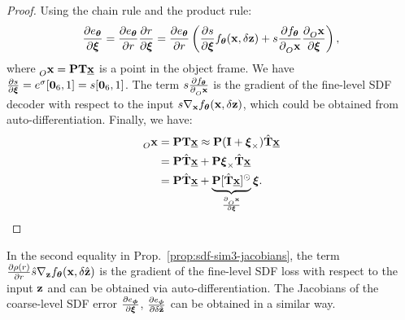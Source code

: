 \begin{proof}
Using the chain rule and the product rule:
\begin{equation*}
\begin{aligned}
  \frac{\partial e_{\boldsymbol{\theta}}}{\partial\boldsymbol{\xi}} 
  = 
  \frac{\partial e_{\boldsymbol{\theta}}}{\partial r}
  \frac{\partial r}{\partial\boldsymbol{\xi}}
  = 
    \frac{\partial e_{\boldsymbol{\theta}}}{\partial r}
    \left(
      \frac{\partial s}{\partial\boldsymbol{\xi}}
      f_{\boldsymbol{\theta}} (\mathbf{x},\delta\mathbf{z})
      +
      s
      \frac{\partial f_{\boldsymbol{\theta}}}{\partial{}^{}_{O}\mathbf{x}}
      \frac{\partial {}^{}_{O}\mathbf{x}}{\partial\boldsymbol{\xi}}
    \right), 
\end{aligned}
\end{equation*}
where ${}^{}_{O}\mathbf{x} = \mathbf{P}\mathbf{T} \underline{\mathbf{x}}$ is a point in the object frame. We have $
\frac{\partial s}{\partial\boldsymbol{\xi}}
  = 
  e^\sigma [{\bf0}_6,1]
  = s [{\bf0}_6,1]
$. 
The term $s\frac{\partial f_{\boldsymbol{\theta}}}{\partial{}^{}_{O}\mathbf{x}}$ is the gradient of the fine-level SDF decoder with respect to the input $s \nabla_{\mathbf{x}} f_{\boldsymbol{\theta}}(\mathbf{x}, \delta\mathbf{z})$, which could be obtained from auto-differentiation. Finally, we have:
%
\begin{equation*}
\begin{aligned}
{}^{}_{O} \mathbf{x} &= \mathbf{P} \mathbf{T} \underline{\mathbf{x}} \approx 
\mathbf{P} (\mathbf{I} + \boldsymbol{\xi}_\times) \hat{\mathbf{T}} \underline{\mathbf{x}} \\
&=
\mathbf{P} \hat{\mathbf{T}} \underline{\mathbf{x}}
+
\mathbf{P} \boldsymbol{\xi}_\times \hat{\mathbf{T}} \underline{\mathbf{x}} \\ 
&= 
\mathbf{P} \hat{\mathbf{T}} \underline{\mathbf{x}}
+
\underbrace{\mathbf{P} [\hat{\mathbf{T}} \underline{\mathbf{x}}]^\odot}_{\frac{\partial {}^{}_{O} \mathbf{x}}{\partial \boldsymbol{\xi}}} \boldsymbol{\xi}. 
\end{aligned}\qedhere
\end{equation*}
\end{proof}


In the second equality in Prop.~\ref{prop:sdf-sim3-jacobians}, the term $\frac{\partial \rho(r)}{\partial r} \hat{s} \nabla_{\mathbf{z}} f_{\boldsymbol{\theta}}(\mathbf{x}, \delta\hat{\mathbf{z}})$ is the gradient of the fine-level SDF loss with respect to the input $\mathbf{z}$ and can be obtained via auto-differentiation. The Jacobians of the coarse-level SDF error $\frac{\partial e_{\boldsymbol{\phi}}}{\partial \boldsymbol{\xi}}$, $\frac{\partial e_{\boldsymbol{\phi}}}{\partial \delta \tilde{\mathbf{z}}}$ can be obtained in a similar way. 



